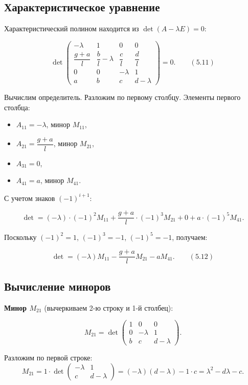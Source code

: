 \documentclass[a4paper, 12pt]{article}
\begin{document}
\subsection{Характеристическое уравнение}

Характеристический полином находится из $\det(A - \lambda E) = 0$:

\[
\det
\begin{pmatrix}
-\lambda & 1 & 0 & 0 \\[1em]
\dfrac{g + a}{l} & \dfrac{b}{l} - \lambda & \dfrac{c}{l} & \dfrac{d}{l} \\[1em]
0 & 0 & -\lambda & 1 \\[1em]
a & b & c & d - \lambda
\end{pmatrix} = 0. \qquad (5.11)
\]

Вычислим определитель. Разложим по первому столбцу. Элементы первого столбца:
\begin{itemize}
    \item $A_{11} = -\lambda$, минор $M_{11}$,
    \item $A_{21} = \dfrac{g + a}{l}$, минор $M_{21}$,
    \item $A_{31} = 0$,
    \item $A_{41} = a$, минор $M_{41}$.
\end{itemize}

С учетом знаков $(-1)^{i+1}$:

\[
\det = (-\lambda) \cdot (-1)^{2} M_{11} + \frac{g + a}{l} \cdot (-1)^{3} M_{21} + 0 + a \cdot (-1)^{5} M_{41}.
\]

Поскольку $(-1)^{2} = 1$, $(-1)^{3} = -1$, $(-1)^{5} = -1$, получаем:

\[
\det = (-\lambda) M_{11} - \frac{g + a}{l} M_{21} - a M_{41}. \qquad (5.12)
\]

\subsection{Вычисление миноров}

\textbf{Минор $M_{21}$} (вычеркиваем 2-ю строку и 1-й столбец):

\[
M_{21} = \det
\begin{pmatrix}
1 & 0 & 0 \\[1em]
0 & -\lambda & 1 \\[1em]
b & c & d - \lambda
\end{pmatrix}.
\]

Разложим по первой строке:
\[
M_{21} = 1 \cdot \det \begin{pmatrix} -\lambda & 1 \\ c & d - \lambda \end{pmatrix} = (-\lambda)(d - \lambda) - 1 \cdot c = \lambda^2 - d\lambda - c.
\]
\end{document}
